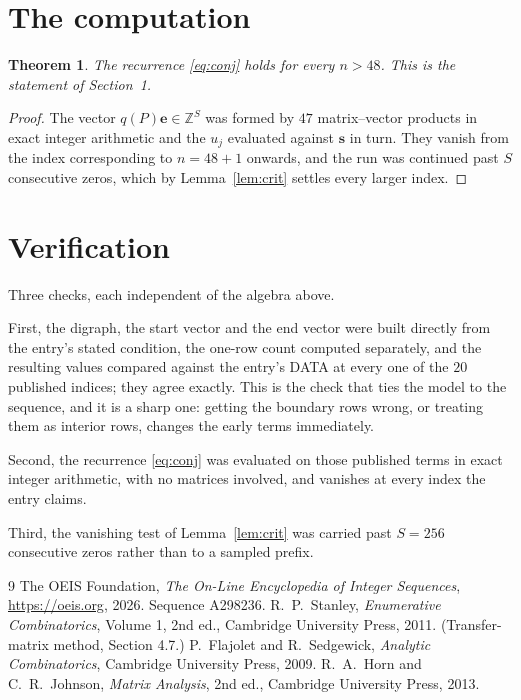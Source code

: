 \documentclass[11pt,a4paper]{article}
\theoremstyle{plain}
\newtheorem{theorem}{Theorem}
\theoremstyle{definition}
\begin{document}
\section{The computation}

\begin{theorem}
The recurrence \eqref{eq:conj} holds for every $n>48$. This is the statement of
Section~1.
\end{theorem}

\begin{proof}
The vector $q(P)\mathbf{e}\in\mathbb{Z}^{S}$ was formed by $47$ matrix--vector
products in exact integer arithmetic and the $u_j$ evaluated against $\mathbf{s}$ in turn.
They vanish from the index corresponding to $n=48+1$ onwards, and the run was continued
past $S$ consecutive zeros, which by Lemma~\ref{lem:crit} settles every larger index.
\end{proof}

\section{Verification}

Three checks, each independent of the algebra above.

First, the digraph, the start vector and the end vector were built directly from the
entry's stated condition, the one-row count computed separately, and the resulting values
compared against the entry's DATA at every one of the $20$ published indices; they
agree exactly. This is the check that ties the model to the sequence, and it is a sharp one:
getting the boundary rows wrong, or treating them as interior rows, changes the early terms
immediately.

Second, the recurrence \eqref{eq:conj} was evaluated on those published terms in exact
integer arithmetic, with no matrices involved, and vanishes at every index the entry claims.

Third, the vanishing test of Lemma~\ref{lem:crit} was carried past $S=256$ consecutive
zeros rather than to a sampled prefix.

\begin{thebibliography}{9}
 The OEIS Foundation, \emph{The On-Line Encyclopedia of Integer
Sequences}, \url{https://oeis.org}, 2026. Sequence A298236.
 R.~P.~Stanley, \emph{Enumerative Combinatorics}, Volume 1, 2nd ed.,
Cambridge University Press, 2011. (Transfer-matrix method, Section 4.7.)
 P.~Flajolet and R.~Sedgewick, \emph{Analytic Combinatorics}, Cambridge
University Press, 2009.
 R.~A.~Horn and C.~R.~Johnson, \emph{Matrix Analysis}, 2nd ed., Cambridge
University Press, 2013.
\end{thebibliography}
\end{document}
